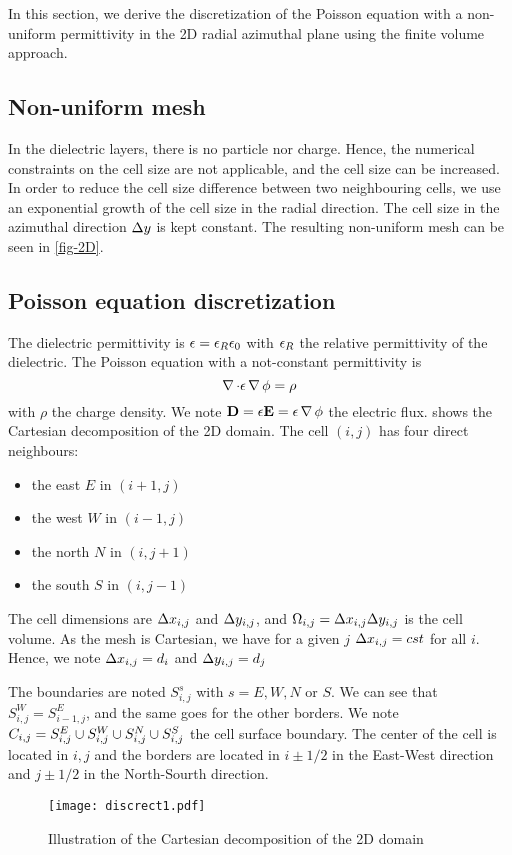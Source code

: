   In this section, we derive the discretization of the Poisson equation with a non-uniform permittivity in the \ac{2D} radial azimuthal plane using the finite volume approach.


  \subsection{Non-uniform mesh}

    In the dielectric layers, there is no particle nor charge.
    Hence, the numerical constraints on the cell size are not applicable, and the cell size can be increased.
    In order to reduce the cell size difference between two neighbouring cells, we use an exponential growth of the cell size in the radial direction.
    The cell size in the azimuthal direction $\Delta y$ is kept constant.
    The resulting non-uniform mesh can be seen in \cref{fig-2D}.


  \subsection{Poisson equation discretization}


  The dielectric permittivity is $\epsilon= \epsilon_{R} \epsilon_0$ with $\epsilon_{R}$ the relative permittivity of the dielectric.
  The Poisson equation with a not-constant permittivity is
  \begin{equation} \label{eq-poissondiel}
    \operatorname{{\mathbf \nabla}} \cdot \epsilon \operatorname{{\mathbf \nabla}} \phi = \rho
  \end{equation}
  with $\rho$ the charge density.
  We note ${\mathbf D}=\epsilon {\mathbf E} = \epsilon \operatorname{{\mathbf \nabla}} \phi$ the electric flux.
   shows the Cartesian decomposition of the \ac{2D} domain.
  The cell $(i,j)$ has four direct neighbours\string:
  \begin{itemize}
    \item the east $E$ in $(i+1,j)$
    \item the west $W$ in $(i-1, j)$
    \item the north $N$ in $(i, j+1)$
    \item the south $S$ in $(i, j-1)$
  \end{itemize}
  The cell dimensions are $\Delta x_{i,j}$ and $\Delta y_{i,j}$, and $\Omega_{i,j}=\Delta x_{i,j} \Delta y_{i,j}$ is the cell volume.
  As the mesh is Cartesian, we have for a given $j$ $\Delta x_{i,j} = cst$ for all $i$. Hence, we note $\Delta x_{i,j} = d_i$ and $\Delta y_{i,j} = d_j$

  The boundaries are noted $S^s_{i,j}$ with $s=E,W,N$ or $S$.
  We can see that $S^W_{i,j}=S^E_{i-1,j}$, and the same goes for the other borders.
  We note $C_{i,j} = S^E_{i,j} \cup S^W_{i,j} \cup S^N_{i,j} \cup S^S_{i,j}$ the cell surface boundary.
  The center of the cell is located in $i,j$ and the borders are located in $i\pm 1/2$ in the East-West direction and $j\pm 1/2$ in the North-Sourth direction.
  \begin{figure}[hbt]
    \centering
    \texttt{[image: discrect1.pdf]}
    \caption{Illustration of the Cartesian decomposition of the \ac{2D} domain}
    \label{fig-decompo1}
  \end{figure}


